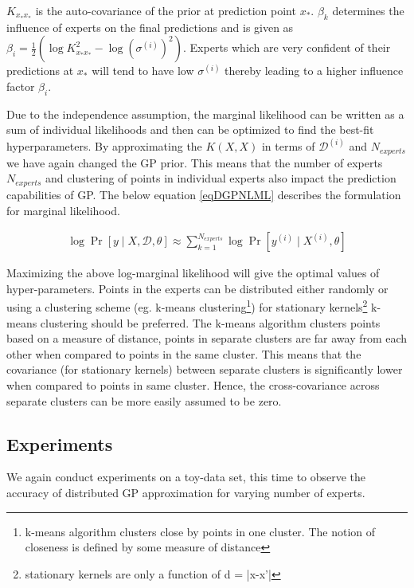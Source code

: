 \(K_{x_{*}x_{*}}\) is the auto-covariance of the prior at prediction point \(x_{*}\). \(\beta_{k}\) determines the influence of experts on the final predictions \cite{cao2014generalized} and is given as \(\beta_{i} = \frac{1}{2}(\log K_{x_{*}x_{*}}^{2} - \log(\sigma^{(i)})^{2})\). Experts which are very confident of their predictions at \(x_{*}\) will tend to have low \(\sigma^{(i)}\) thereby leading to a higher influence factor \(\beta_{i}\).

Due to the independence assumption, the marginal likelihood can be written as a sum of individual likelihoods and then can be optimized to find the best-fit hyperparameters. By approximating the \(K(X, X)\) in terms of \(\mathcal{D}^{(i)}\) and \(N_{experts}\) we have again changed the GP prior. This means that the number of experts \(N_{experts}\) and clustering of points in individual experts also impact the prediction capabilities of GP. The below equation \ref{eqDGPNLML} describes the formulation for marginal likelihood. 

\begin{align}\label{eqDGPNLML}
    \log \Pr[y \mid X, \mathcal{D}, \theta] \approx \sum_{k=1}^{N_{experts}} \log \Pr[y^{(i)}\mid X^{(i)}, \theta]
 \end{align}

Maximizing the above log-marginal likelihood will give the optimal values of hyper-parameters. Points in the experts can be distributed either randomly or using a clustering scheme (eg. k-means clustering\footnote{k-means algorithm clusters close by points in one cluster. The notion of closeness is defined by some measure of distance}) for stationary kernels\footnote{stationary kernels are only a function of d = |x-x'|} k-means clustering should be preferred. The k-means algorithm clusters points based on a measure of distance, points in separate clusters are far away from each other when compared to points in the same cluster. This means that the covariance (for stationary kernels) between separate clusters is significantly lower when compared to points in same cluster. Hence, the cross-covariance across separate clusters can be more easily assumed to be zero.

\subsection{Experiments}\label{subSecDistributedExperiments}
We again conduct experiments on a toy-data set, this time to observe the accuracy of distributed GP approximation for varying number of experts. 

